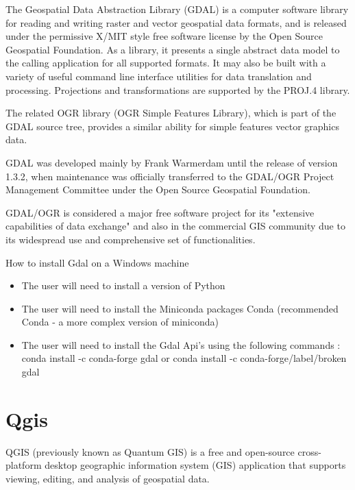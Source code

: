 \documentclass[12pt, a4paper]{report}
\begin{document}
	The Geospatial Data Abstraction Library (GDAL) is a computer software library for reading and writing raster and vector geospatial data formats, and is released under the permissive X/MIT style free software license by the Open Source Geospatial Foundation. As a library, it presents a single abstract data model to the calling application for all supported formats. It may also be built with a variety of useful command line interface utilities for data translation and processing. Projections and transformations are supported by the PROJ.4 library.

	The related OGR library (OGR Simple Features Library), which is part of the GDAL source tree, provides a similar ability for simple features vector graphics data.

	GDAL was developed mainly by Frank Warmerdam until the release of version 1.3.2, when maintenance was officially transferred to the GDAL/OGR Project Management Committee under the Open Source Geospatial Foundation.

	GDAL/OGR is considered a major free software project for its "extensive capabilities of data exchange" and also in the commercial GIS community due to its widespread use and comprehensive set of functionalities.

{\Large How to install Gdal on a Windows machine\par}

\begin{itemize}
  \item The user will need to install a version of Python
  \item The user will need to install the Miniconda packages Conda (recommended Conda - a more complex version of miniconda)
  \item The user will need to install the Gdal Api's using the following commands : conda install -c conda-forge gdal or conda install -c conda-forge/label/broken gdal
\end{itemize}



\newpage{}

\section{Qgis} 

QGIS (previously known as Quantum GIS) is a free and open-source cross-platform desktop geographic information system (GIS) application that supports viewing, editing, and analysis of geospatial data. 
\end{document}
